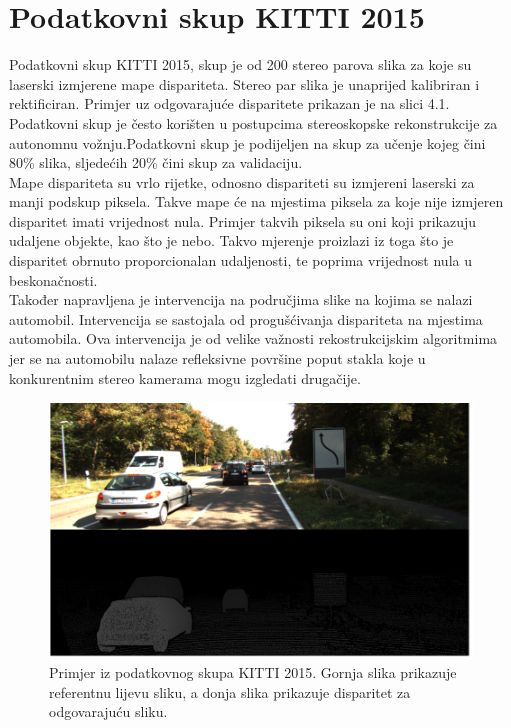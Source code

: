 \documentclass[times, utf8, zavrsni, numeric]{fer}
\begin{document}
\section{Podatkovni skup KITTI 2015}
Podatkovni skup KITTI 2015, skup je od 200 stereo parova slika za koje su laserski izmjerene mape dispariteta. Stereo par slika je unaprijed kalibriran i rektificiran. Primjer uz odgovarajuće disparitete prikazan je na slici 4.1. Podatkovni skup je često korišten u postupcima stereoskopske rekonstrukcije za autonomnu vožnju.Podatkovni skup je podijeljen na skup za učenje kojeg čini 80\% slika, sljedećih 20\% čini skup za validaciju.\\
Mape dispariteta su vrlo rijetke, odnosno dispariteti su izmjereni laserski za manji podskup piksela. Takve mape će na mjestima piksela za koje nije izmjeren disparitet imati vrijednost nula. Primjer takvih piksela su oni koji prikazuju udaljene objekte, kao što je nebo. Takvo mjerenje proizlazi iz toga što je disparitet obrnuto proporcionalan udaljenosti, te poprima vrijednost nula u beskonačnosti. \\
Također napravljena je intervencija na područjima slike na kojima se nalazi automobil. Intervencija se sastojala od progušćivanja dispariteta na mjestima automobila. Ova intervencija je od velike važnosti rekostrukcijskim algoritmima jer se na automobilu nalaze refleksivne površine poput stakla koje u konkurentnim stereo kamerama mogu izgledati drugačije.\cite{zbontar}
\begin{figure}[htb]
\centering
\includegraphics[width = 14.5cm]{img/slika11.png}
\caption{Primjer iz podatkovnog skupa KITTI 2015. Gornja slika prikazuje referentnu lijevu sliku, a donja slika prikazuje disparitet za odgovarajuću sliku.}
\label{fig:KITTI}
\end{figure}
\end{document}
